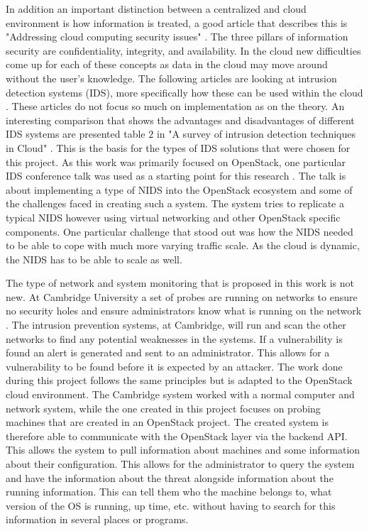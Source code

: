 \documentclass[12pt]{article}
\begin{document}
In addition an important distinction between a centralized and cloud environment is how information is treated, a good article that describes this is "Addressing cloud computing security issues" \cite{zissis2012addressing}. The three pillars of information security are confidentiality, integrity, and availability. In the cloud new difficulties come up for each of these concepts as data in the cloud may move around without the user's knowledge.  The following articles are looking at intrusion detection systems (IDS), more specifically how these can be used within the cloud \cite{SurveyOfIDS, patel2013intrusion}. These articles do not focus so much on implementation as on the theory. An interesting comparison that shows the advantages and disadvantages of different IDS systems are presented table $2$ in "A survey of intrusion detection techniques in Cloud" \cite{SurveyOfIDS}. This is the basis for the types of IDS solutions that were chosen for this project. As this work was primarily focused on OpenStack, one particular IDS conference talk was used as a starting point for this research \cite{videoPresentation}. The talk is about implementing a type of NIDS into the OpenStack ecosystem and some of the challenges faced in creating such a system. The system tries to replicate a typical NIDS however using virtual networking and other OpenStack specific components. One particular challenge that stood out was how the NIDS needed to be able to cope with much more varying traffic scale. As the cloud is dynamic, the NIDS has to be able to scale as well.

The type of network and system monitoring that is proposed in this work is not new. At Cambridge University a set of probes are running on networks to ensure no security holes and ensure administrators know what is running on the network \cite{CambUni}. The intrusion prevention systems, at Cambridge, will run and scan the other networks to find any potential weaknesses in the systems. If a vulnerability is found an alert is generated and sent to an administrator. This allows for a vulnerability to be found before it is expected by an attacker. The work done during this project follows the same principles but is adapted to the OpenStack cloud environment. The Cambridge system worked with a normal computer and network system, while the one created in this project focuses on probing machines that are created in an OpenStack project. The created system is therefore able to communicate with the OpenStack layer via the backend API. This allows the system to pull information about machines and some information about their configuration. This allows for the administrator to query the system and have the information about the threat alongside information about the running information. This can tell them who the machine belongs to, what version of the OS is running, up time, etc. without having to search for this information in several places or programs.
\end{document}
